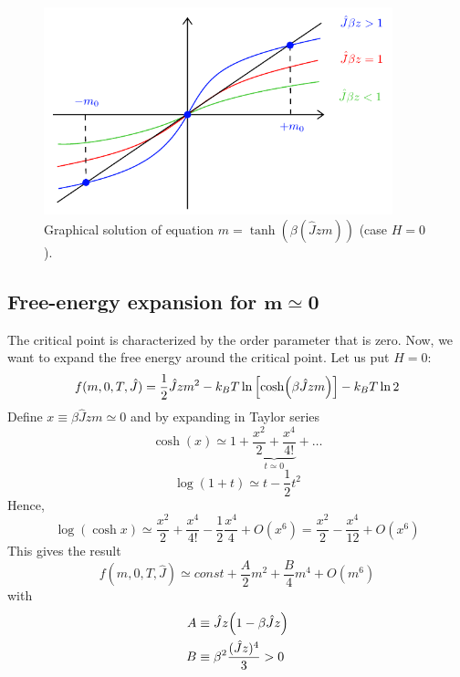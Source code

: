 \documentclass[../main/main.tex]{subfiles}
\begin{document}
\begin{figure}[h!]
\centering
\includegraphics[width=0.9\textwidth]{../lessons/11_image/1.pdf}
\caption{\label{fig:11_1} Graphical solution of equation \(m =  \tanh (\beta (\hat{J}z m )) \) (case \(H=0\)).}
\end{figure}


\subsection{Free-energy expansion for \( \pmb{m \simeq 0} \) }
The critical point is characterized by the order parameter that is zero. Now, we want to expand the free energy around the critical point. Let us put \( H=0 \):
\begin{equation}
  f(m,0,T,\hat{J} ) = \frac{1}{2}\hat{J}zm^2 -k_BT \ln{\qty[\cosh(\beta \hat{J}zm )]} - k_BT \ln{2}
\end{equation}
Define \( x \equiv \beta \hat{J} z m \simeq 0  \) and by expanding in Taylor series
\begin{equation*}
  \cosh (x) \simeq 1 + \underbrace{\frac{x^2}{2} + \frac{x^4}{4!}}_{t \simeq 0}  + \dots
\end{equation*}
\begin{equation*}
  \log{(1+t)} \simeq t - \frac{1}{2}t^2
\end{equation*}
Hence,
\begin{equation*}
  \log{(\cosh x)} \simeq \frac{x^2}{2} + \frac{x^4}{4!} - \frac{1}{2} \frac{x^4}{4}+O(x^6)
  = \frac{x^2}{2} - \frac{x^4}{12}+O(x^6)
\end{equation*}
This gives the result
\begin{equation}
  f(m,0,T,\hat{J} ) \simeq  const + \frac{A}{2} m^2 + \frac{B}{4} m^4 + O (m^6)
\end{equation}
with
\begin{subequations}
\begin{align}
   A & \equiv  \hat{J} z \qty(1- \beta \hat{J} z) \\
    B & \equiv  \beta ^2 \frac{(\hat{J}z )^4}{3} > 0
\end{align}
\end{subequations}
\end{document}
